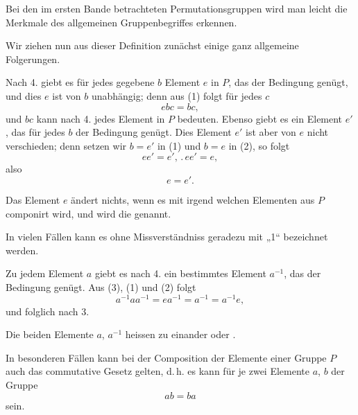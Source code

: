 
Bei den im ersten Bande betrachteten Permutationsgruppen wird man leicht die Merkmale des allgemeinen Gruppenbegriffes erkennen.

Wir ziehen nun aus dieser Definition zunächst einige ganz allgemeine Folgerungen.

Nach 4. giebt es für jedes gegebene $b$  Element $e$ in $P$, das der Bedingung
genügt, und dies $e$ ist von $b$ unabhängig; denn aus (1) folgt für jedes $c$
\[
ebc = bc,
\]
und $bc$ kann nach 4. jedes Element in $P$ bedeuten. Ebenso giebt es ein Element $e'$, das für jedes $b$ der Bedingung
genügt. Dies Element $e'$ ist aber von $e$ nicht verschieden; denn setzen wir $b = e'$ in (1) und $b = e$ in (2), so folgt
\[
e e' = e', \, . \, e e' = e, %
\]
also
\[
e = e'.
\]

Das Element $e$ ändert nichts, wenn es mit irgend welchen Elementen aus $P$ componirt wird, und wird die  genannt.

In vielen Fällen kann es ohne Missverständniss geradezu mit „1“ bezeichnet werden.

Zu jedem Element $a$ giebt es nach 4. ein bestimmtes Element $a^{-1}$, das der Bedingung
genügt. Aus (3), (1) und (2) folgt
\[
a^{-1} a a^{-1} = e a^{-1} = a^{-1} = a^{-1} e,
\]
und folglich nach 3.

Die beiden Elemente $a$, $a^{-1}$ heissen zu einander  oder .

In besonderen Fällen kann bei der Composition der Elemente einer Gruppe $P$ auch das commutative Gesetz gelten, d.\,h. es kann für je zwei Elemente $a$, $b$ der Gruppe
\[
a b = b a
\]
sein.
